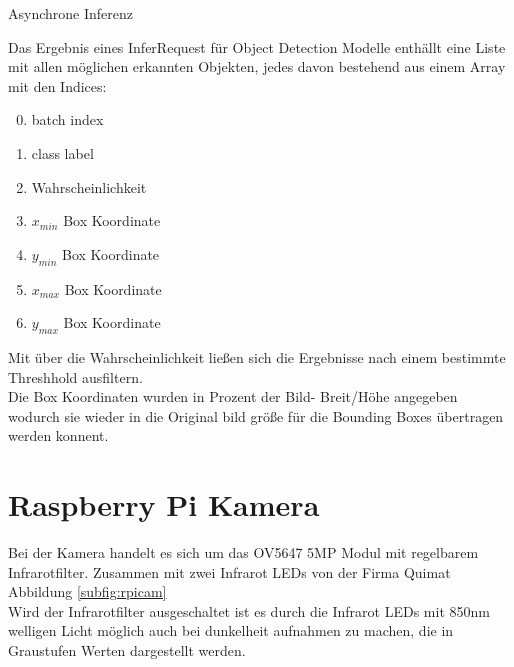 \begin{algorithm}[H]
    \caption{Asynchrone Inferenz}
\end{algorithm}


Das Ergebnis eines InferRequest für Object Detection Modelle 
enthällt eine Liste mit allen möglichen erkannten Objekten, jedes 
davon bestehend aus einem Array mit den Indices:

\begin{enumerate}
    \setcounter{enumi}{-1}
    \item batch index
    \item class label
    \item Wahrscheinlichkeit
    \item $x_{min}$ Box Koordinate
    \item $y_{min}$ Box Koordinate
    \item $x_{max}$ Box Koordinate
    \item $y_{max}$ Box Koordinate
\end{enumerate}

Mit über die Wahrscheinlichkeit ließen sich die Ergebnisse 
nach einem bestimmte Threshhold ausfiltern.\\
Die Box Koordinaten wurden in Prozent der Bild- Breit/Höhe 
angegeben wodurch sie wieder in die Original bild größe 
für die Bounding Boxes übertragen werden konnent.




\section{Raspberry Pi Kamera}\label{sec:raspicam}


Bei der Kamera handelt es sich um das OV5647 5MP Modul mit regelbarem 
Infrarotfilter. Zusammen mit zwei Infrarot LEDs von der Firma Quimat 
Abbildung \ref{subfig:rpicam}
\\
Wird der Infrarotfilter ausgeschaltet ist es durch die Infrarot LEDs mit 
850nm welligen Licht möglich auch bei dunkelheit aufnahmen zu machen, 
die in Graustufen Werten dargestellt werden.

